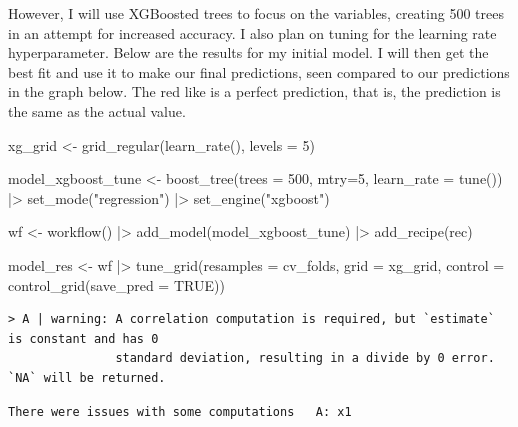 \documentclass[
  letterpaper,
  DIV=11,
  numbers=noendperiod]{scrartcl}
\newenvironment{Shaded}{\begin{snugshade}}{\end{snugshade}}
\newcommand{\AttributeTok}[1]{\textcolor[rgb]{0.40,0.45,0.13}{#1}}
\newcommand{\ConstantTok}[1]{\textcolor[rgb]{0.56,0.35,0.01}{#1}}
\newcommand{\DecValTok}[1]{\textcolor[rgb]{0.68,0.00,0.00}{#1}}
\newcommand{\FunctionTok}[1]{\textcolor[rgb]{0.28,0.35,0.67}{#1}}
\newcommand{\NormalTok}[1]{\textcolor[rgb]{0.00,0.23,0.31}{#1}}
\newcommand{\OtherTok}[1]{\textcolor[rgb]{0.00,0.23,0.31}{#1}}
\newcommand{\SpecialCharTok}[1]{\textcolor[rgb]{0.37,0.37,0.37}{#1}}
\newcommand{\StringTok}[1]{\textcolor[rgb]{0.13,0.47,0.30}{#1}}
\begin{document}
However, I will use XGBoosted trees to focus on the variables, creating
500 trees in an attempt for increased accuracy. I also plan on tuning
for the learning rate hyperparameter. Below are the results for my
initial model. I will then get the best fit and use it to make our final
predictions, seen compared to our predictions in the graph below. The
red like is a perfect prediction, that is, the prediction is the same as
the actual value.

\begin{Shaded}
\begin{Highlighting}[]
\NormalTok{xg\_grid }\OtherTok{\textless{}{-}} \FunctionTok{grid\_regular}\NormalTok{(}\FunctionTok{learn\_rate}\NormalTok{(), }\AttributeTok{levels =} \DecValTok{5}\NormalTok{)}

\NormalTok{model\_xgboost\_tune }\OtherTok{\textless{}{-}} \FunctionTok{boost\_tree}\NormalTok{(}\AttributeTok{trees =} \DecValTok{500}\NormalTok{, }\AttributeTok{mtry=}\DecValTok{5}\NormalTok{, }\AttributeTok{learn\_rate =} \FunctionTok{tune}\NormalTok{()) }\SpecialCharTok{|\textgreater{}} 
  \FunctionTok{set\_mode}\NormalTok{(}\StringTok{"regression"}\NormalTok{) }\SpecialCharTok{|\textgreater{}} 
  \FunctionTok{set\_engine}\NormalTok{(}\StringTok{"xgboost"}\NormalTok{)}

\NormalTok{wf }\OtherTok{\textless{}{-}} \FunctionTok{workflow}\NormalTok{() }\SpecialCharTok{|\textgreater{}}
  \FunctionTok{add\_model}\NormalTok{(model\_xgboost\_tune) }\SpecialCharTok{|\textgreater{}}
  \FunctionTok{add\_recipe}\NormalTok{(rec)}

\NormalTok{model\_res }\OtherTok{\textless{}{-}}\NormalTok{ wf }\SpecialCharTok{|\textgreater{}}
  \FunctionTok{tune\_grid}\NormalTok{(}\AttributeTok{resamples =}\NormalTok{ cv\_folds,}
            \AttributeTok{grid =}\NormalTok{ xg\_grid,}
            \AttributeTok{control =} \FunctionTok{control\_grid}\NormalTok{(}\AttributeTok{save\_pred =} \ConstantTok{TRUE}\NormalTok{))}
\end{Highlighting}
\end{Shaded}

\begin{verbatim}
> A | warning: A correlation computation is required, but `estimate` is constant and has 0
               standard deviation, resulting in a divide by 0 error. `NA` will be returned.
\end{verbatim}

\begin{verbatim}
There were issues with some computations   A: x1
\end{verbatim}
\end{document}
